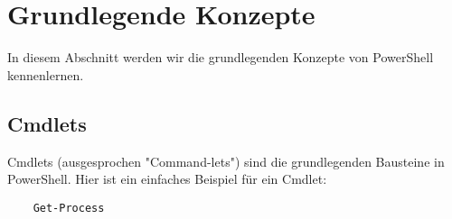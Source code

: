 \section{Grundlegende Konzepte}
In diesem Abschnitt werden wir die grundlegenden Konzepte von PowerShell kennenlernen.

\subsection{Cmdlets}
Cmdlets (ausgesprochen "Command-lets") sind die grundlegenden Bausteine in PowerShell. Hier ist ein einfaches Beispiel für ein Cmdlet:
\begin{verbatim}
	Get-Process
\end{verbatim}
